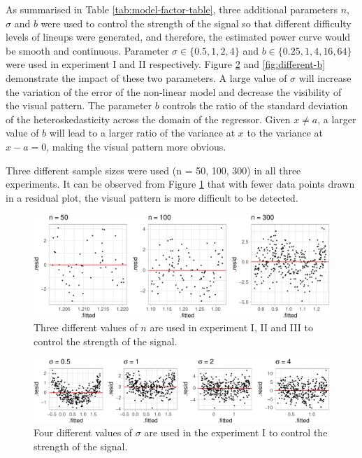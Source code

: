 \documentclass[]{interact}
\theoremstyle{plain}%
\theoremstyle{definition}
\theoremstyle{remark}
\begin{document}
As summarised in Table \ref{tab:model-factor-table}, three additional
parameters \(n\), \(\sigma\) and \(b\) were used to control the strength
of the signal so that different difficulty levels of lineups were
generated, and therefore, the estimated power curve would be smooth and
continuous. Parameter \(\sigma \in \{0.5, 1, 2, 4\}\) and
\(b \in \{0.25, 1, 4, 16, 64\}\) were used in experiment I and II
respectively. Figure \ref{fig:different-sigma} and \ref{fig:different-b}
demonstrate the impact of these two parameters. A large value of
\(\sigma\) will increase the variation of the error of the non-linear
model and decrease the visibility of the visual pattern. The parameter
\(b\) controls the ratio of the standard deviation of the
heteroskedasticity across the domain of the regressor. Given
\(x \neq a\), a larger value of \(b\) will lead to a larger ratio of the
variance at \(x\) to the variance at \(x - a = 0\), making the visual
pattern more obvious.

Three different sample sizes were used (n = 50, 100, 300) in all three
experiments. It can be observed from Figure \ref{fig:different-n} that
with fewer data points drawn in a residual plot, the visual pattern is
more difficult to be detected.

\begin{figure}

{\centering \includegraphics[width=1\linewidth]{paper_comparison_files/figure-latex/different-n-1} 

}

\caption{Three different values of $n$ are used in experiment I, II and III to control the strength of the signal.}\label{fig:different-n}
\end{figure}

\begin{figure}

{\centering \includegraphics[width=1\linewidth]{paper_comparison_files/figure-latex/different-sigma-1} 

}

\caption{Four different values of $\sigma$ are used in the experiment I to control the strength of the signal.}\label{fig:different-sigma}
\end{figure}
\end{document}
